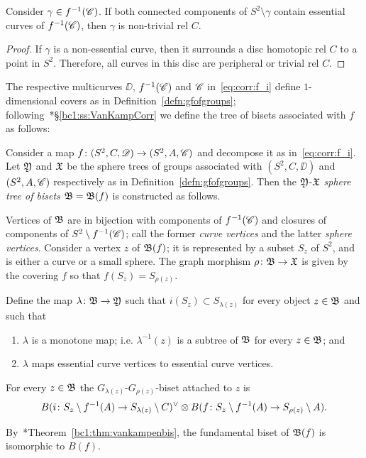 \documentclass{amsart}
\begin{document}
\begin{lem}\label{lem:PropOfEssCurves}
  Consider $\gamma\in f^{-1}({\mathscr C})$. If both connected components of
  $S^2\setminus \gamma$ contain essential curves of $f^{-1}({\mathscr C})$,
  then $\gamma$ is non-trivial rel $C$.
\end{lem}
\begin{proof}
  If $\gamma$ is a non-essential curve, then it surrounds a disc
  homotopic rel $C$ to a point in $S^2$. Therefore, all curves in this
  disc are peripheral or trivial rel $C$.
\end{proof}

The respective multicurves $\DD$, $f^{-1}({\mathscr C})$ and ${\mathscr C}$
in~\eqref{eq:corr:f_i} define $1$-dimensional covers as in
Definition~\ref{defn:gfofgroups};
following~\cite{bartholdi-dudko:bc1}*{\S\ref{bc1:ss:VanKampCorr}} we
define the tree of bisets associated with $f$ as follows:

\begin{defn}\label{defn:gfofbisets}
  Consider a map $f\colon(S^2,C,{\mathscr D})\to(S^2,A,{\mathscr C})$ and decompose it
  as in~\eqref{eq:corr:f_i}. Let ${\mathfrak Y}$ and ${\mathfrak X}$ be the sphere trees
  of groups associated with $(S^2,C,\DD)$ and $(S^2,A,{\mathscr C})$
  respectively as in Definition~\ref{defn:gfofgroups}. Then the
  ${\mathfrak Y}$-${\mathfrak X}$ \emph{sphere tree of bisets ${\mathfrak B}={\mathfrak B}(f)$} is
  constructed as follows.

  Vertices of ${\mathfrak B}$ are in bijection with components of
  $f^{-1}({\mathscr C})$ and closures of components of $S^2\setminus
  f^{-1}({\mathscr C})$; call the former \emph{curve vertices} and the latter
  \emph{sphere vertices}.  Consider a vertex $z$ of ${\mathfrak B}(f)$;
  it is represented by a subset $S_z$ of $S^2$, and is either a curve
  or a small sphere. The graph morphism $\rho\colon {\mathfrak B}\to
  {\mathfrak X}$ is given by the covering $f$ so that $f(S_z)=S_{\rho(z)}$.

  Define the map $\lambda \colon {\mathfrak B} \to {\mathfrak Y}$ such
  that $i(S_z)\subset S_{\lambda(z)}$ for every object
  $z\in {\mathfrak B}$ and such that
  \begin{enumerate}\renewcommand\theenumi{TB\ensuremath{{}_\arabic{enumi}}}
  \item $\lambda$ is a monotone map; i.e. $\lambda^{-1}(z)$ is a subtree
    of ${\mathfrak B}$ for every $z\in {\mathfrak B}$;
    and\label{cond:1:defn:gfofbisets}
  \item $\lambda$ maps essential curve vertices to essential curve
    vertices.\label{cond:2:defn:gfofbisets}
  \end{enumerate}

  \noindent For every $z\in {\mathfrak B}$ the
  $G_{\lambda(z)}$-$G_{\rho(z)}$-biset attached to $z$ is
  \begin{equation}\label{eq:dfn:B_z}
    B(i\colon S_z\setminus f^{-1}(A) \to S_{\lambda(z)}\setminus C)^\vee\otimes B(f\colon S_z\setminus f^{-1}(A) \to S_{\rho(z)}\setminus A).\qedhere
  \end{equation} 
\end{defn}
\noindent
By~\cite{bartholdi-dudko:bc1}*{Theorem~\ref{bc1:thm:vankampenbis}}, the
fundamental biset of ${\mathfrak B}(f)$ is isomorphic to $B(f)$.
\end{document}
